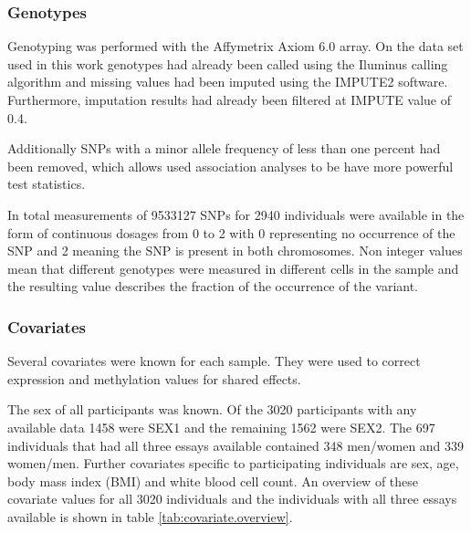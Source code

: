 \documentclass[a4paper,12pt,twoside,openright]{article}
\begin{document}
 
\subsubsection{Genotypes}
\label{Data:Genotypes}
Genotyping was performed with the Affymetrix Axiom 6.0 array. On the data set used in this work genotypes had already been called using the Iluminus calling algorithm and missing values had been imputed using the IMPUTE2 software\cite{10.1371/journal.pgen.1000529}. Furthermore, imputation results had already been filtered at IMPUTE value of 0.4.  

Additionally SNPs with a minor allele frequency of less than one percent had been removed, which allows used association analyses to be have more powerful test statistics.

In total measurements of 9533127 SNPs for 2940 individuals were available in the form of continuous dosages from 0 to 2 with 0 representing no occurrence of the SNP and 2 meaning the SNP is present in both chromosomes. Non integer values mean that different genotypes were measured in different cells in the sample and the resulting value describes the fraction of the occurrence of the variant. 

\subsubsection{Covariates}
\label{Data:Covariates}
Several covariates were known for each sample. They were used to correct expression and methylation values for shared effects. 

The sex of all participants was known. Of the 3020 participants with any available data 1458 were SEX1 and the remaining 1562 were SEX2. The 697 individuals that had all three essays available contained 348 men/women and 339 women/men.
Further covariates specific to participating individuals are sex, age, body mass index (BMI) and white blood cell count. An overview of these covariate values for all 3020 individuals and the individuals with all three essays available is shown in table \ref{tab:covariate.overview}.
\end{document}
